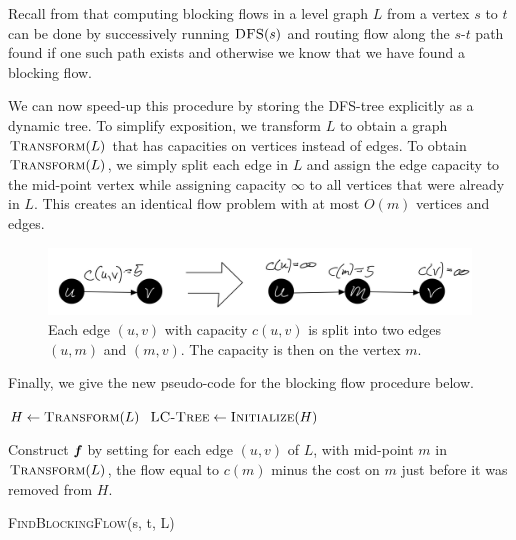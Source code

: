 Recall from  that computing blocking flows in a level graph $L$ from a vertex $s$ to $t$ can be done by successively running $\textsc{DFS}(s)$ and routing flow along the $s$-$t$ path found if one such path exists and otherwise we know that we have found a blocking flow. 

We can now speed-up this procedure by storing the DFS-tree explicitly as a dynamic tree. To simplify exposition, we transform $L$ to obtain a graph $\textsc{Transform}(L)$ that has capacities on vertices instead of edges. To obtain $\textsc{Transform}(L)$, we simply split each edge in $L$ and assign the edge capacity to the mid-point vertex while assigning capacity $\infty$ to all vertices that were already in $L$. This creates an identical flow problem with at most $O(m)$ vertices and edges.

\begin{figure}[!ht]
    \centering
    \includegraphics[scale=0.2]{./fig/TransformToVertCaps_lectureDynamicTree.jpeg}
    \caption{Each edge $(u,v)$ with capacity $c(u,v)$ is split into two edges $(u,m)$ and $(m,v)$. The capacity is then on the vertex $m$.}
    \label{fig:my_label}
\end{figure}

Finally, we give the new pseudo-code for the blocking flow procedure below.

\begin{algorithm}[H]
  \SetAlgoLined
  $H \leftarrow \textsc{Transform}(L)$\;
  $\textsc{LC-Tree} \gets \textsc{Initialize}(H)$\;
  
  Construct $\boldsymbol{\mathit{f}}$ by setting for each edge $(u,v)$ of $L$, with mid-point $m$ in $\textsc{Transform}(L)$, the flow equal to $c(m)$ minus the cost on $m$ just before it was removed from $H$.
  \caption{\textsc{FindBlockingFlow}(s, t, L)}
\end{algorithm}

